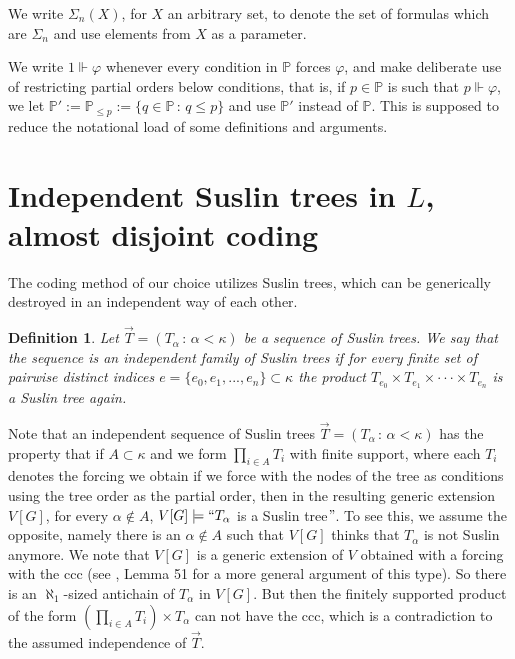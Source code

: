 \documentclass[a4paper,11pt]{article}
\newtheorem{definition}[theorem]{Definition}
\newcommand{\forceP}{\mathbb{P}}
\begin{document}
We write $\Sigma_n(X)$, for $X$ an arbitrary set, to denote the set of formulas which are $\Sigma_n$ and use elements from $X$ as a parameter. 


We write $1 \Vdash \varphi$ whenever every condition in $\forceP$ forces $\varphi$, and make deliberate use of restricting partial orders below conditions, that is, if $p \in \forceP $ is such that $p \Vdash \varphi$, we let $\forceP':= \forceP_{\le p}:=\{ q \in \forceP \, : \, q \le p\}$ and use $\forceP'$ instead of $\forceP$. This is supposed to reduce the notational load of some definitions and arguments.






\section{Independent Suslin trees in $L$, almost disjoint coding}
The coding method of our choice utilizes Suslin trees, which can be generically destroyed in an independent way of each other. 
\begin{definition}
 Let $\vec{T} = (T_{\alpha} \, : \, \alpha < \kappa)$ be a sequence of Suslin trees. We say that the sequence is an 
 independent family of Suslin trees if for every finite set of pairwise distinct indices $e= \{e_0, e_1,...,e_n\} \subset \kappa$ the product $T_{e_0} \times T_{e_1} \times \cdot \cdot \cdot \times T_{e_n}$ 
 is a Suslin tree again.
\end{definition}
Note that an independent sequence of Suslin trees $\vec{T} = (T_{\alpha} \, : \, \alpha < \kappa)$ has the property that if $A \subset \kappa$ and we form 
$ \prod_{i \in A} T_i $
with finite support, where each $T_i$ denotes the forcing we obtain if we force with the nodes of the tree  as conditions using the tree order as the partial order, then in the resulting generic extension $V[G]$, for every $\alpha \notin A$, $V[G] \models `` T_{\alpha}$ is a Suslin tree$"$. To see this, we assume the opposite, namely there is an $\alpha \notin A$ such that $V[G]$ thinks that $T_{\alpha}$ is not Suslin anymore. We note that $V[G]$ is a generic extension of $V$ obtained with a forcing with the ccc (see \cite{Ho}, Lemma 51 for a more general argument of this type). So there is an $\aleph_1$-sized antichain of $T_{\alpha}$ in $V[G]$. But then the finitely supported product of the form $(\prod_{i \in A}  T_i )\times T_{\alpha}$ can not have the ccc, which is a contradiction to the  assumed independence of $\vec{T}$.
\end{document}
